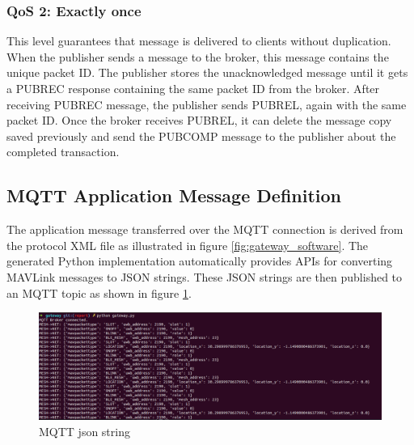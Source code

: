 \documentclass[\main/main.tex]{subfiles}
\begin{document}
\subsubsection{QoS 2: Exactly once}


This level guarantees that message is delivered to clients without  duplication. When the publisher sends a message to the broker, this message contains the unique packet ID. The publisher stores the unacknowledged message until it gets a PUBREC response containing the same packet ID from the broker. After receiving PUBREC message, the publisher sends PUBREL, again with the same packet ID. Once the broker receives PUBREL, it can delete the message copy saved previously and send the PUBCOMP message to the publisher about the completed transaction.

\subsection{MQTT Application Message Definition}
The application message transferred over the MQTT connection is derived from the protocol XML file as illustrated in figure \ref{fig:gateway_software}. The generated Python implementation automatically provides APIs for converting MAVLink messages to JSON strings.  These JSON strings are then published to an MQTT topic as shown in figure \ref{fig:mqtt_json_string}.

\begin{figure}[H]
    \begin{center}
        \includegraphics[width=1\textwidth]{mqtt_json_string.png}
    \end{center}
    \caption{MQTT json string}
    \label{fig:mqtt_json_string}
\end{figure}
\end{document}
